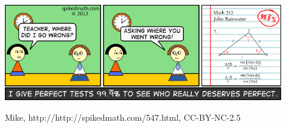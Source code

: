 \documentclass[article,10pt,a4,oneside]{memoir}
\begin{document}
\begin{minipage}[b]{0.9\textwidth}
\includegraphics[width=0.9\textwidth]{547-the-perfect-score.png}
\begin{center}
\tiny Mike, http://http://spikedmath.com/547.html, CC-BY-NC-2.5
\end{center}
\end{minipage}
\end{document}
